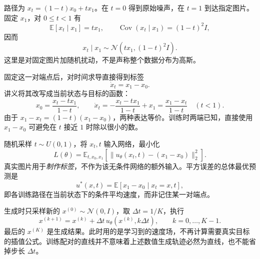 \begin{workedsolution}
路径为 $x_t=(1-t)x_0+t x_1$。在 $t=0$ 得到原始噪声，在 $t=1$ 到达指定图片。固定 $x_1$，对 $0\le t<1$ 有
\[
  \mathbb E[x_t\mid x_1]=t x_1,\qquad
  \operatorname{Cov}(x_t\mid x_1)=(1-t)^2I,
\]
因而
\[
  x_t\mid x_1\sim\mathcal N(t x_1,(1-t)^2I).
\]
这里是对固定图片加随机扰动，不是声称整个数据分布为高斯。

固定这一对端点后，对时间求导直接得到标签
\[
  \boxed{\dot x_t=x_1-x_0}.
\]
讲义将其改写成当前状态与目标的函数：
\[
  x_0=\frac{x_t-tx_1}{1-t},\qquad
  \dot x_t=-\frac{x_t-tx_1}{1-t}+x_1
    =\frac{x_1-x_t}{1-t}\quad(t<1).
\]
由于 $x_1-x_t=(1-t)(x_1-x_0)$，两种表达等价。训练时两端已知，直接使用 $x_1-x_0$ 可避免在 $t$ 接近 $1$ 时除以很小的数。

随机采样 $t\sim U(0,1)$，将 $x_t,t$ 输入网络，最小化
\[
  L(\theta)=\mathbb E_{t,x_0,x_1}
    \left[\|u_\theta(x_t,t)-(x_1-x_0)\|_2^2\right].
\]
真实图片用于\emph{制作标签}，不作为该无条件网络的额外输入。平方误差的总体最优预测是
\[
  u^*(x,t)=\mathbb E[x_1-x_0\mid x_t=x,t],
\]
即各训练路径在当前状态下的条件平均速度，而非记住某一对端点。

生成时只采样新的 $x^{(0)}\sim\mathcal N(0,I)$，取 $\Delta t=1/K$，执行
\[
  x^{(k+1)}=x^{(k)}+\Delta t\,u_\theta(x^{(k)},k\Delta t),
  \qquad k=0,\ldots,K-1.
\]
最后的 $x^{(K)}$ 是生成结果。此时用的是学习到的速度场，不再计算需要真实目标的插值公式。训练配对的直线并不意味着上述数值生成轨迹必然为直线，也不能省掉步长 $\Delta t$。
\end{workedsolution}
